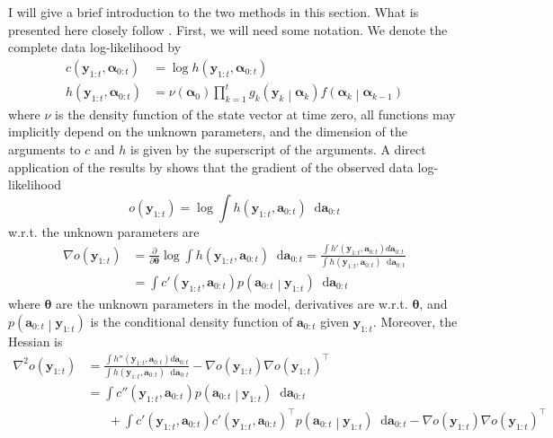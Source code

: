 \documentclass[notitlepage]{article}
\renewcommand{\vec}[1]{\bm{#1}}
\newcommand{\Lparen}[1]{\left( #1\right)}
\newcommand{\Cond}[2]{ #1 \middle\vert  #2}
\newcommand*\diff{\mathop{}\!\mathrm{d}}
\newcommand{\optor}[2]{#1\Lparen{#2}}
\newcommand{\optorC}[3]{\optor{#1}{\Cond{#2}{#3}}}
\begin{document}
I will give a brief introduction to the two methods in this section. What is presented here closely follow 
\cite{poyiadjis11}. First, we will need some notation. We denote the complete data
log-likelihood by %
%
\begin{align*}
c\Lparen{\vec y_{1:t}, \vec\alpha_{0:t}} &= \log h\Lparen{\vec y_{1:t}, \vec\alpha_{0:t}} \\
%
h\Lparen{\vec y_{1:t}, \vec\alpha_{0:t}} &= 
	\nu\Lparen{\vec\alpha_0}\prod_{k = 1}^t 
	\optorC{g_k}{\vec y_k}{\vec\alpha_k}
	\optorC{f}{\vec\alpha_k}{\vec\alpha_{k - 1}}
\end{align*}%
% 
where $\nu$ is the density function of the state vector at time zero, 
all functions may implicitly depend on the unknown parameters, 
and the dimension of the arguments to $c$ and $h$ is given 
by the superscript of the arguments. A direct application of the results by \cite{louis82}
shows that the gradient of the observed data log-likelihood %
%
$$o\Lparen{\vec y_{1:t}} = 
	\log \int h\Lparen{\vec y_{1:t}, \vec a_{0:t}}\diff\vec a_{0:t}$$
%
w.r.t. the unknown parameters are %
%
\begin{align}
\nabla o\Lparen{\vec y_{1:t}}
&= \frac{\partial}{\partial\vec\theta} \log \int h\Lparen{\vec y_{1:t}, \vec a_{0:t}} 
		\diff\vec a_{0:t}
%
= \frac{\int h'\Lparen{\vec y_{1:t}, \vec a_{0:t}}d\vec a_{0:t}
	}{
	\int h\Lparen{\vec y_{1:t}, \vec a_{0:t}}\diff\vec a_{0:t}}\label{eqn:ONscore}\\
%
&= \int c'\Lparen{\vec y_{1:t}, \vec a_{0:t}}\optorC{p}{\vec a_{0:t}}{\vec y_{1:t}}
	\diff\vec a_{0:t}\nonumber
\end{align}%
% 
where $\vec\theta$ are the unknown parameters in the model, 
derivatives are w.r.t. $\vec\theta$, and 
$\optorC{p}{\vec a_{0:t}}{\vec y_{1:t}}$ is the conditional density function of 
$\vec a_{0:t}$ given $\vec y_{1:t}$. Moreover, the Hessian is%
%
\begin{align}
\nabla^2 o\Lparen{\vec y_{1:t}}
&= \frac{\int h''\Lparen{\vec y_{1:t}, \vec a_{0:t}}d\vec a_{0:t}}{
	\int h\Lparen{\vec y_{1:t}, \vec a_{0:t}}\diff\vec a_{0:t}} - 
	 \nabla o\Lparen{\vec y_{1:t}}
	 \nabla o\Lparen{\vec y_{1:t}}^\top \nonumber\\
%
&= \int c''\Lparen{\vec y_{1:t}, \vec a_{0:t}}\optorC{p}{\vec a_{0:t}}{\vec y_{1:t}}
	\diff\vec a_{0:t} \label{eqn:ONsqHess}\\
&\hspace{20pt}+\int c'\Lparen{\vec y_{1:t}, \vec a_{0:t}}
    c'\Lparen{\vec y_{1:t}, \vec a_{0:t}}^\top
	\optorC{p}{\vec a_{0:t}}{\vec y_{1:t}}\diff\vec a_{0:t} 
	- \nabla o\Lparen{\vec y_{1:t}}
	  \nabla o\Lparen{\vec y_{1:t}}^\top \nonumber
\end{align}
\end{document}
